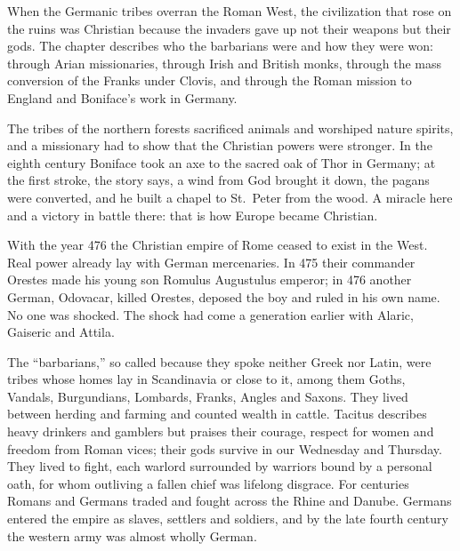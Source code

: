 
\begin{inbrief}
When the Germanic tribes overran the Roman West, the civilization that rose on the ruins was Christian
because the invaders gave up not their weapons but their gods. The chapter describes who the
barbarians were and how they were won: through Arian missionaries, through Irish and British monks,
through the mass conversion of the Franks under Clovis, and through the Roman mission to England and
Boniface's work in Germany.
\end{inbrief}

The tribes of the northern forests sacrificed animals and worshiped nature spirits, and a missionary
had to show that the Christian powers were stronger. In the eighth century Boniface took an axe to
the sacred oak of Thor in Germany; at the first stroke, the story says, a wind from God brought it
down, the pagans were converted, and he built a chapel to St.~Peter from the wood. A miracle here and
a victory in battle there: that is how Europe became Christian.

With the year 476 the Christian empire of Rome ceased to exist in the West. Real power already lay with
German mercenaries. In 475 their commander Orestes made his young son Romulus Augustulus emperor; in
476 another German, Odovacar, killed Orestes, deposed the boy and ruled in his own name. No one was
shocked. The shock had come a generation earlier with Alaric, Gaiseric and Attila.

The ``barbarians,'' so called because they spoke neither Greek nor Latin, were tribes whose homes lay in Scandinavia or close to it, among them Goths, Vandals, Burgundians, Lombards, Franks, Angles and Saxons. They lived
between herding and farming and counted wealth in cattle. Tacitus describes heavy drinkers and
gamblers but praises their courage, respect for women and freedom from Roman vices; their gods survive
in our Wednesday and Thursday. They lived to fight, each warlord surrounded by warriors bound by a
personal oath, for whom outliving a fallen chief was lifelong disgrace. For centuries Romans and
Germans traded and fought across the Rhine and Danube. Germans entered the empire as slaves, settlers
and soldiers, and by the late fourth century the western army was almost wholly German.

